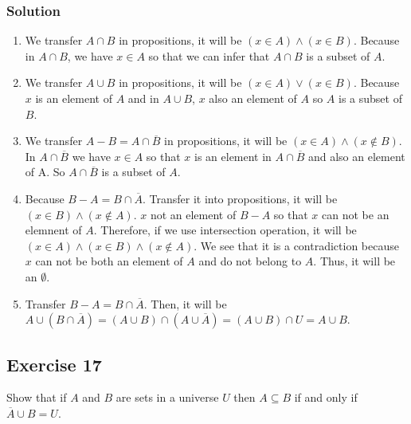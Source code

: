 \documentclass{article}
\theoremstyle{mytheoremstyle}
\theoremstyle{mytheoremstyle}
\theoremstyle{myproblemstyle}
\begin{document}
    \subsubsection*{Solution}
        \begin{enumerate} [label = (\alph*)]
            \item We transfer \(A \cap B\) in propositions, it will be \((x \in A) \land (x \in B)\).
            Because in \(A \cap B\), we have \(x \in A \) so that we can infer that \(A \cap B\) is a subset of \(A\).
            \item We transfer \(A \cup B\) in propositions, it will be \((x \in A) \lor (x \in B)\).
            Because \(x\) is an element of \(A\) and in \(A \cup B\), \(x\) also an element of \(A\) so \(A\) is a subset of \(B\).
            \item We transfer \(A - B = A \cap \overline{B}\) in propositions, it will be \((x \in A) \land (x \notin B)\).
            In \(A \cap \overline{B}\) we have \(x \in A\) so that \(x\) is an element in \(A \cap \overline{B}\) and also an element of A.
            So \(A \cap \overline{B}\) is a subset of \(A\).
            \item Because \(B - A = B \cap \overline{A}\). Transfer it into propositions, it will be \((x \in B) \land (x \notin A)\).
            \(x\) not an element of \(B - A\) so that \(x\) can not be an elemnent of \(A\). Therefore, if we
            use intersection operation, it will be \((x \in A) \land (x \in B) \land (x \notin A)\). We see that it is a
            contradiction because \(x\) can not be both an element of \(A\) and do not belong to \(A\). Thus, it will be an \(\emptyset\).
            \item Transfer \(B - A = B \cap \overline{A}\). Then, it will be \(A \cup (B \cap \overline{A}) = (A \cup B) \cap (A \cup 
            \overline{A}) = (A \cup B) \cap U = A \cup B\).
        \end{enumerate}
    \subsection*{Exercise 17}
        Show that if \(A\) and \(B\) are sets in a universe \(U\) then \(A \subseteq B\) if and only if \(\overline{A} \cup B = U\).
\end{document}
